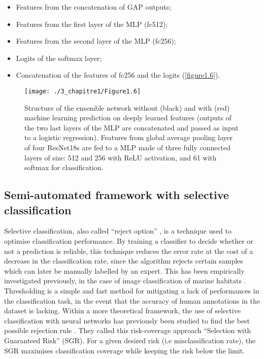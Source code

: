 \begin{itemize}
    \item Features from the concatenation of GAP outputs; 
    \item Features from the first layer of the MLP (fc512);
    \item Features from the second layer of the MLP (fc256);
    \item Logits of the softmax layer;
    \item Concatenation of the features of fc256 and the logits (\autoref{figure1.6}). 
    
\end{itemize}

\begin{figure}[H]
	\begin{center}
	\texttt{[image: ./3\_chapitre1/Figure1.6]}
		\caption[Structure of the ensemble network]{Structure of the ensemble network without (black) and with (red) machine learning prediction on deeply learned features (outputs of the two last layers of the MLP are concatenated and passed as input to a logistic regression). Features from global average pooling layer of four ResNet18s are fed to a MLP made of three fully connected layers of size: 512 and 256 with ReLU activation, and 61 with softmax for classification.}
	\label{figure1.6}
\end{center}
\end{figure}

\subsection{Semi-automated framework with selective classification}\label{chapitre1_4.4}
Selective classification, also called “reject option” \citep{herbei_classification_2006}, is a technique used to optimise classification performance. By training a classifier to decide whether or not a prediction is reliable, this technique reduces the error rate at the cost of a decrease in the classification rate, since the algorithm rejects certain samples which can later be manually labelled by an expert. This has been empirically investigated previously, in the case of image classification of marine habitats \citep{beijbom_automated_2012, beijbom_towards_2015}. Thresholding is a simple and fast method for mitigating a lack of performances in the classification task, in the event that the accuracy of human annotations in the dataset is lacking. Within a more theoretical framework, the use of selective classification with neural networks has previously been studied to find the best possible rejection rule \citep{geifman_selective_2017}. They called this risk-coverage approach “Selection with Guaranteed Risk” (SGR). For a given desired risk (i.e misclassification rate), the SGR maximises classification coverage while keeping the risk below the limit. 

